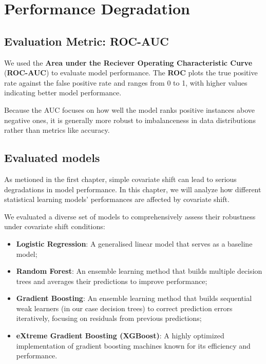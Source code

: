 \chapter{Performance Degradation}

\vspace{-0.3em}

\section{Evaluation Metric: ROC-AUC}

We used the \textbf{Area under the Reciever Operating Characteristic Curve} (\textbf{ROC-AUC}) to evaluate model performance. The \textbf{ROC} plots the true positive rate against the false positive rate and ranges from 0 to 1, with higher values indicating better model performance.

Because the AUC focuses on how well the model ranks positive instances above negative ones, it is generally more robust to imbalanceness in data distributions rather than metrics like accuracy.

\vspace{-0.3em}

\section{Evaluated models}

As metioned in the first chapter, simple covariate shift can lead to serious degradations in model performance. In this chapter, we will analyze how different statistical learning models' performances are affected by covariate shift. 

We evaluated a diverse set of models to comprehensively assess their robustness under covariate shift conditions:

\begin{itemize}
    \item \textbf{Logistic Regression}: A generalised linear model that serves as a baseline model;
    \item \textbf{Random Forest}: An ensemble learning method that builds multiple decision trees and averages their predictions to improve performance;
    \item \textbf{Gradient Boosting}: An ensemble learning method that builds sequential weak learners (in our case decision trees) to correct prediction errors iteratively, focusing on residuals from previous predictions;
    \item \textbf{eXtreme Gradient Boosting (XGBoost)}: A highly optimized implementation of gradient boosting machines known for its efficiency and performance.
\end{itemize}

